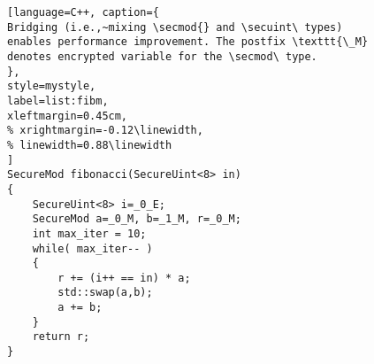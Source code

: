 \begin{figure}
\begin{minipage}{\linewidth}
\begin{lstlisting}[language=C++, caption={
Bridging (i.e.,~mixing \secmod{} and \secuint\ types) enables performance improvement. The postfix \texttt{\_M} denotes encrypted variable for the \secmod\ type.
},
style=mystyle, 
label=list:fibm,
xleftmargin=0.45cm,
% xrightmargin=-0.12\linewidth,
% linewidth=0.88\linewidth
]
SecureMod fibonacci(SecureUint<8> in)
{
    SecureUint<8> i=_0_E;
    SecureMod a=_0_M, b=_1_M, r=_0_M;
    int max_iter = 10;
    while( max_iter-- )
    {
        r += (i++ == in) * a;
        std::swap(a,b);
        a += b;
    }
    return r;
}
\end{lstlisting}
\end{minipage}
\vspace{-0.8cm}

\end{figure}
